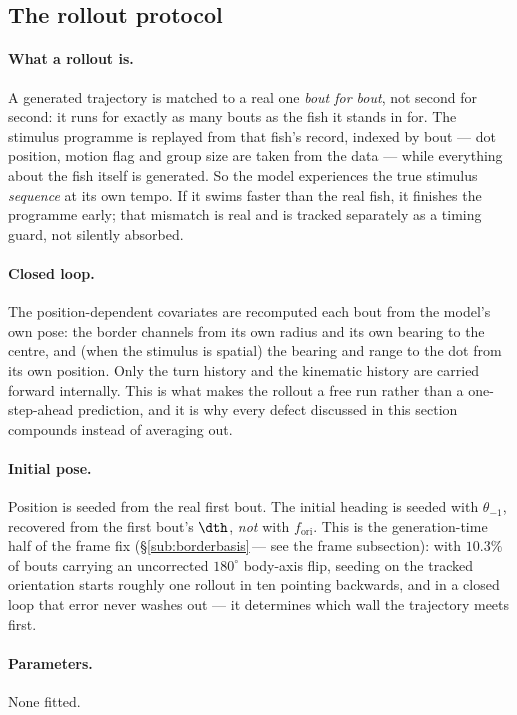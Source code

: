 \subsection{The rollout protocol}
\label{sub:rollout}

\paragraph{What a rollout is.} A generated trajectory is matched to a real one \emph{bout for
bout}, not second for second: it runs for exactly as many bouts as the fish it stands in for. The
stimulus programme is replayed from that fish's record, indexed by bout --- dot position, motion
flag and group size are taken from the data --- while everything about the fish itself is
generated. So the model experiences the true stimulus \emph{sequence} at its own tempo. If it
swims faster than the real fish, it finishes the programme early; that mismatch is real and is
tracked separately as a timing guard, not silently absorbed.

\paragraph{Closed loop.} The position-dependent covariates are recomputed each bout from the
model's own pose: the border channels from its own radius and its own bearing to the centre, and
(when the stimulus is spatial) the bearing and range to the dot from its own position. Only the
turn history and the kinematic history are carried forward internally. This is what makes the
rollout a free run rather than a one-step-ahead prediction, and it is why every defect discussed
in this section compounds instead of averaging out.

\paragraph{Initial pose.} Position is seeded from the real first bout. The initial heading is
seeded with $\theta_{-1}$, recovered from the first bout's $\dth$, \emph{not} with
$f_{\text{ori}}$. This is the generation-time half of the frame fix
(\S\ref{sub:borderbasis}\,--- see the frame subsection): with $10.3\%$ of bouts carrying an
uncorrected $180^\circ$ body-axis flip, seeding on the tracked orientation starts roughly one
rollout in ten pointing backwards, and in a closed loop that error never washes out --- it
determines which wall the trajectory meets first.

\paragraph{Parameters.} None fitted.


